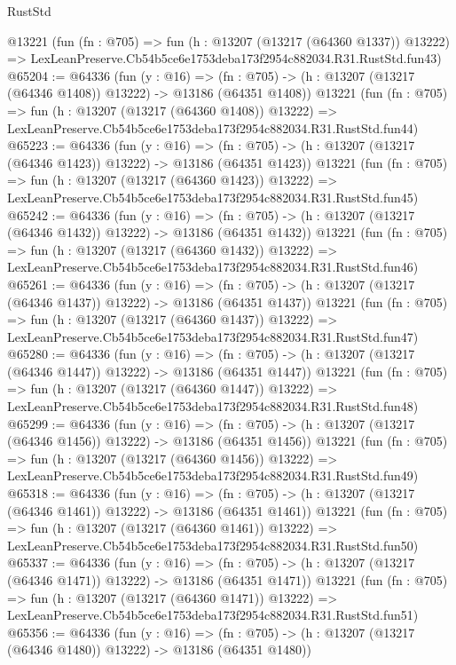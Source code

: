 \begin{lexlean}{RustStd}
\begin{coremodule}
    @13221
    (fun (fn : @705) =>
    fun (h : @13207 (@13217 (@64360 @1337)) @13222) =>
    LexLeanPreserve.Cb54b5ce6e1753deba173f2954c882034.R31.RustStd.fun43)
@65204 := @64336
    (fun (y : @16) =>
    (fn : @705) -> (h : @13207 (@13217 (@64346 @1408)) @13222) -> @13186 (@64351 @1408))
    @13221
    (fun (fn : @705) =>
    fun (h : @13207 (@13217 (@64360 @1408)) @13222) =>
    LexLeanPreserve.Cb54b5ce6e1753deba173f2954c882034.R31.RustStd.fun44)
@65223 := @64336
    (fun (y : @16) =>
    (fn : @705) -> (h : @13207 (@13217 (@64346 @1423)) @13222) -> @13186 (@64351 @1423))
    @13221
    (fun (fn : @705) =>
    fun (h : @13207 (@13217 (@64360 @1423)) @13222) =>
    LexLeanPreserve.Cb54b5ce6e1753deba173f2954c882034.R31.RustStd.fun45)
@65242 := @64336
    (fun (y : @16) =>
    (fn : @705) -> (h : @13207 (@13217 (@64346 @1432)) @13222) -> @13186 (@64351 @1432))
    @13221
    (fun (fn : @705) =>
    fun (h : @13207 (@13217 (@64360 @1432)) @13222) =>
    LexLeanPreserve.Cb54b5ce6e1753deba173f2954c882034.R31.RustStd.fun46)
@65261 := @64336
    (fun (y : @16) =>
    (fn : @705) -> (h : @13207 (@13217 (@64346 @1437)) @13222) -> @13186 (@64351 @1437))
    @13221
    (fun (fn : @705) =>
    fun (h : @13207 (@13217 (@64360 @1437)) @13222) =>
    LexLeanPreserve.Cb54b5ce6e1753deba173f2954c882034.R31.RustStd.fun47)
@65280 := @64336
    (fun (y : @16) =>
    (fn : @705) -> (h : @13207 (@13217 (@64346 @1447)) @13222) -> @13186 (@64351 @1447))
    @13221
    (fun (fn : @705) =>
    fun (h : @13207 (@13217 (@64360 @1447)) @13222) =>
    LexLeanPreserve.Cb54b5ce6e1753deba173f2954c882034.R31.RustStd.fun48)
@65299 := @64336
    (fun (y : @16) =>
    (fn : @705) -> (h : @13207 (@13217 (@64346 @1456)) @13222) -> @13186 (@64351 @1456))
    @13221
    (fun (fn : @705) =>
    fun (h : @13207 (@13217 (@64360 @1456)) @13222) =>
    LexLeanPreserve.Cb54b5ce6e1753deba173f2954c882034.R31.RustStd.fun49)
@65318 := @64336
    (fun (y : @16) =>
    (fn : @705) -> (h : @13207 (@13217 (@64346 @1461)) @13222) -> @13186 (@64351 @1461))
    @13221
    (fun (fn : @705) =>
    fun (h : @13207 (@13217 (@64360 @1461)) @13222) =>
    LexLeanPreserve.Cb54b5ce6e1753deba173f2954c882034.R31.RustStd.fun50)
@65337 := @64336
    (fun (y : @16) =>
    (fn : @705) -> (h : @13207 (@13217 (@64346 @1471)) @13222) -> @13186 (@64351 @1471))
    @13221
    (fun (fn : @705) =>
    fun (h : @13207 (@13217 (@64360 @1471)) @13222) =>
    LexLeanPreserve.Cb54b5ce6e1753deba173f2954c882034.R31.RustStd.fun51)
@65356 := @64336
    (fun (y : @16) =>
    (fn : @705) -> (h : @13207 (@13217 (@64346 @1480)) @13222) -> @13186 (@64351 @1480))

\end{coremodule}
\end{lexlean}

